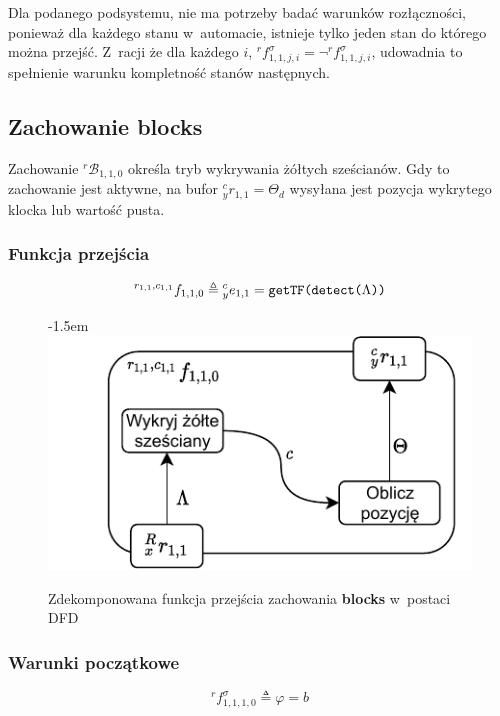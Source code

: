 Dla podanego podsystemu, nie ma potrzeby badać warunków rozłączności, ponieważ dla każdego stanu w~automacie, istnieje tylko jeden stan do którego można przejść. Z~racji że dla każdego $i$, ${}^{r}f^{\sigma}_{1,1,j,i} = \neg {}^{r}f^{\sigma}_{1,1,j,i}$, udowadnia to spełnienie warunku kompletność stanów następnych.

\subsection{Zachowanie blocks}
\label{subsec:vr-camera-blocks}
Zachowanie ${}^{r}\mathcal{B}_{1,1,0}$ określa tryb wykrywania żółtych sześcianów. Gdy to zachowanie jest aktywne, na bufor ${}^{c}_{y}r_{1,1} = \Theta_{d}$ wysyłana jest pozycja wykrytego klocka lub wartość pusta. 

\subsubsection{Funkcja przejścia}
\begin{equation}
    {}^{r_{1,1}, c_{1,1}}f_{1,1,0} \triangleq {}^{c}_{y}e_{1,1} = \text{\texttt{getTF(detect(}}\Lambda\text{\texttt{))}}    
\end{equation}

\begin{figure}[ht]
    \leftskip-1.5em
    \includegraphics[width=\columnwidth]{figures/ISR-vr-camera-fp-blocks.pdf}
    \label{fig:vr-camera-fp-blocks}
    \caption{Zdekomponowana funkcja przejścia zachowania \textbf{blocks} w~postaci DFD}
\end{figure}

\subsubsection{Warunki początkowe}
\begin{equation}
    {}^{r}f^{\sigma}_{1,1,1,0} \triangleq \varphi = b
\end{equation}

